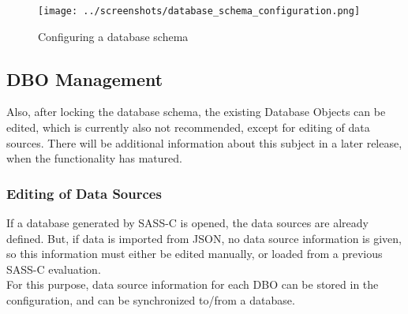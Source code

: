 \begin{figure}[H]
  \hspace*{-1cm}
    \texttt{[image: ../screenshots/database\_schema\_configuration.png]}
  \caption{Configuring a database schema}
  \label{fig:db_schema_configuration}
\end{figure}

\subsection{DBO Management}

Also, after locking the database schema, the existing Database Objects can be edited, which is currently also not recommended, except for editing of data sources. There will be additional information about this subject in a later release, when the functionality has matured.

\subsubsection{Editing of Data Sources}
\label{sec:data_source_editing}

If a database generated by SASS-C is opened, the data sources are already defined. But, if data is imported from JSON, no data source information is given, so this information must either be edited manually, or loaded from a previous SASS-C evaluation. \\

For this purpose, data source information for each DBO can be stored in the configuration, and can be synchronized to/from a database. \\

